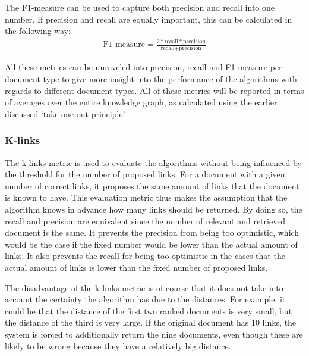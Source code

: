The F1-measure can be used to capture both precision and recall into one number. If precision and recall are equally important, this can be calculated in the following way:
\begin{align}
  \nonumber \textrm{F1-measure} = \frac{2*\textrm{recall}*\textrm{precision}}{\textrm{recall} + \textrm{precision}}
\end{align}

All these metrics can be unraveled into precision, recall and F1-measure per
document type to give more insight into the performance of the algorithms with
regards to different document types. All of these metrics will be reported in terms
of averages over the entire knowledge graph, as calculated using the earlier discussed `take one out
principle'. 

\subsubsection{K-links}
The k-links metric is used to evaluate the algorithms without being influenced by the threshold for the number of proposed links. For a document with a given number of correct links, it proposes the same amount of links that the document is known to have. This evaluation metric thus makes the assumption that the algorithm knows in advance how many links should be returned. By doing so, the recall and precision are equivalent since the number of relevant and retrieved document is the same. It prevents the precision from being too optimistic, which would be the case if the fixed number would be lower than the actual amount of links. It also prevents the recall for being too optimistic in the cases that the actual amount of links is lower than the fixed number of proposed links. 

The disadvantage of the k-links metric is of course that it does not take into account the certainty the algorithm has due to the distances. For example, it could be that the distance of the first two ranked documents is very small, but the distance of the third is very large. If the original document has 10 links, the system is forced to additionally return the nine documents, even though these are likely to be wrong because they have a relatively big distance. 

